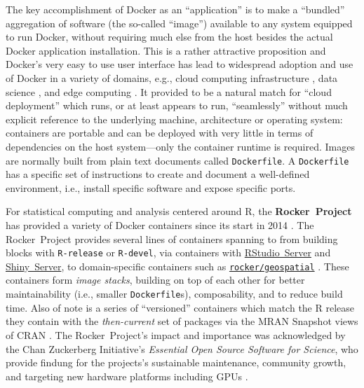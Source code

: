 The key accomplishment of Docker as an ``application'' is to make a
``bundled'' aggregation of software (the so-called ``image'') available
to any system equipped to run Docker, without requiring much else from
the host besides the actual Docker application installation. This is a
rather attractive proposition and Docker's very easy to use user
interface has lead to widespread adoption and use of Docker in a variety
of domains, e.g., cloud computing infrastructure
\citep[e.g.,][]{Bernstein2014}, data science
\citep[e.g.,][]{boettiger_introduction_2015}, and edge computing
\citep[e.g.,][]{alam_orchestration_2018}. It provided to be a natural
match for ``cloud deployment'' which runs, or at least appears to run,
``seamlessly'' without much explicit reference to the underlying
machine, architecture or operating system: containers are portable and
can be deployed with very little in terms of dependencies on the host
system---only the container runtime is required. Images are normally
built from plain text documents called \texttt{Dockerfile}. A
\texttt{Dockerfile} has a specific set of instructions to create and
document a well-defined environment, i.e., install specific software and
expose specific ports.

For statistical computing and analysis centered around R, the
\textbf{Rocker~Project} has provided a variety of Docker containers
since its start in 2014 \citep{RJ-2017-065}. The Rocker~Project provides
several lines of containers spanning to from building blocks with
\texttt{R-release} or \texttt{R-devel}, via containers with
\href{https://rstudio.com/products/rstudio/}{RStudio~Server} and
\href{https://rstudio.com/products/shiny/shiny-server/}{Shiny~Server},
to domain-specific containers such as
\href{https://github.com/rocker-org/geospatial}{\texttt{rocker/geospatial}}
\citep{rocker_geospatial_2019}. These containers form \emph{image
stacks}, building on top of each other for better maintainability (i.e.,
smaller \texttt{Dockerfile}s), composability, and to reduce build time.
Also of note is a series of ``versioned'' containers which match the R
release they contain with the \emph{then-current} set of packages via
the MRAN Snapshot views of CRAN \citep{microsoft_cran_2019}. The
Rocker~Project's impact and importance was acknowledged by the Chan
Zuckerberg Initiative's \emph{Essential Open Source Software for
Science}, who provide findung for the projects's sustainable
maintenance, community growth, and targeting new hardware platforms
including GPUs \citep{chan_zuckerberg_initiative_maintaining_2019}.

